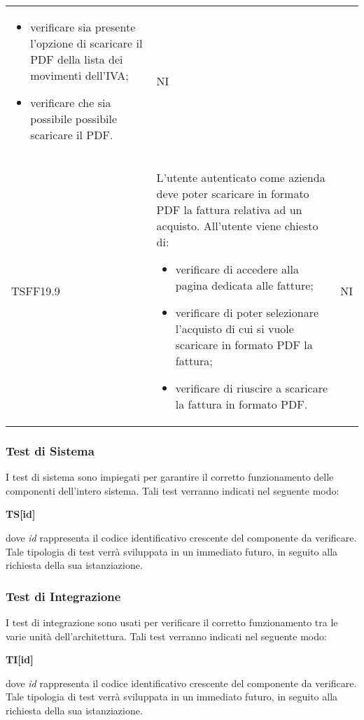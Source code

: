 \begin{table}[H]
\begin{longtable}{ >{\centering}p{} >{\centering}p{}
			>{\centering}p{}}
\begin{itemize}
			\item verificare sia presente l'opzione di scaricare il PDF della lista
			dei movimenti dell'IVA;
			\item verificare che sia possibile possibile scaricare il PDF.
		\end{itemize}
		&	NI	\tabularnewline
		TSFF19.9	&	L'utente autenticato come azienda deve poter scaricare in formato PDF la
		fattura relativa ad un acquisto. All'utente viene chiesto di:
		\begin{itemize}
			\item verificare di accedere alla pagina dedicata alle fatture;
			\item verificare di poter selezionare l'acquisto di cui si vuole scaricare in 
			formato PDF la fattura;
			\item verificare di riuscire a scaricare la fattura in formato PDF.
		\end{itemize}	&	NI	
	
	
	\end{longtable}
	

\end{table}


\subsubsection{Test di Sistema}
I test di sistema sono impiegati per garantire il corretto funzionamento delle 
componenti dell'intero sistema. Tali test verranno indicati nel seguente modo:\\
	\centerline{\textbf{TS[id]}}
dove \textit{id} rappresenta il codice identificativo crescente del componente da
verificare.\\
Tale tipologia di test verrà sviluppata in un immediato futuro, in seguito alla richiesta della sua istanziazione.


\subsubsection{Test di Integrazione}
I test di integrazione sono usati per verificare il corretto funzionamento tra le
varie unità dell'architettura. Tali test verranno indicati nel seguente modo:\\
	\centerline{\textbf{TI[id]}}
dove \textit{id} rappresenta il codice identificativo crescente del componente da
verificare.\\
Tale tipologia di test verrà sviluppata in un immediato futuro, in seguito alla richiesta della sua istanziazione.

